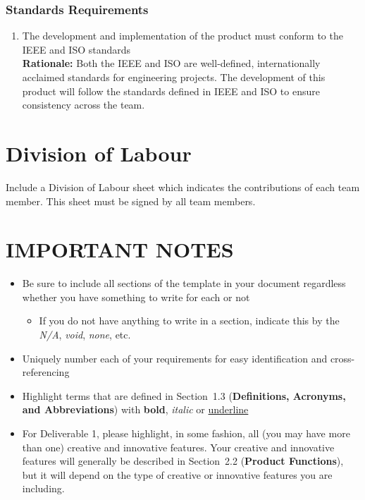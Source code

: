 \documentclass[]{article}
\begin{document}
\subsubsection{Standards Requirements}
\label{ssub:standards_requirements}
\begin{enumerate}[{LR-STD}1. ]
	\item The development and implementation of the product must conform to the IEEE and ISO standards \\
	{\bf Rationale:} Both the IEEE and ISO are well-defined, internationally acclaimed standards for engineering projects. The development of this product will follow the standards defined in IEEE and ISO to ensure consistency across the team.
\end{enumerate}



\appendix
\section{Division of Labour}
\label{sec:division_of_labour}
Include a Division of Labour sheet which indicates the contributions of each team member. This sheet must be signed by all team members.

\newpage
\section*{IMPORTANT NOTES}
\begin{itemize}
	\item Be sure to include all sections of the template in your document regardless whether you have something to write for each or not
	\begin{itemize}
		\item If you do not have anything to write in a section, indicate this by the \emph{N/A}, \emph{void}, \emph{none}, etc.
	\end{itemize}
	\item Uniquely number each of your requirements for easy identification and cross-referencing
	\item Highlight terms that are defined in Section~1.3 (\textbf{Definitions, Acronyms, and Abbreviations}) with \textbf{bold}, \emph{italic} or \underline{underline}
	\item For Deliverable 1, please highlight, in some fashion, all (you may have more than one) creative and innovative features. Your creative and innovative features will generally be described in Section~2.2 (\textbf{Product Functions}), but it will depend on the type of creative or innovative features you are including.
\end{itemize}
\end{document}
